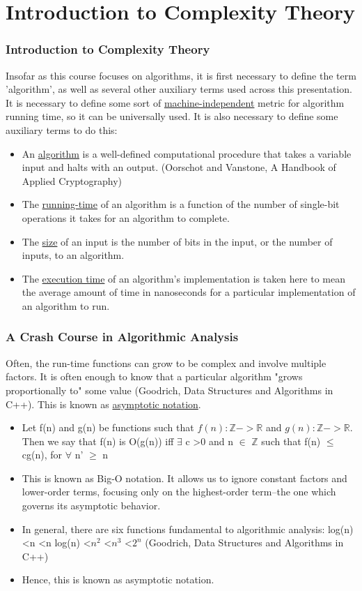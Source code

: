 \documentclass{beamer}
\begin{document}
\section{Introduction to Complexity Theory}
\begin{frame}
\frametitle{Introduction to Complexity Theory}
\small
\indent Insofar as this course focuses on algorithms, it is first necessary to define the term 'algorithm', as well as several other auxiliary terms used across this presentation.
It is necessary to define some sort of \underline{machine-independent} metric for algorithm running time, so it can be universally used. It is also necessary to define some auxiliary terms to do this:
\begin{itemize}
\item An \underline{algorithm} is a well-defined computational procedure that takes a variable input and halts with an output. (Oorschot and Vanstone, A Handbook of Applied Cryptography)
\item The \underline{running-time} of an algorithm is a function of the number of single-bit operations it takes for an algorithm to complete. 
\item The \underline{size} of an input is the number of bits in the input, or the number of inputs, to an algorithm.
\item The \underline{execution time} of an algorithm's implementation is taken here to mean the average amount of time in nanoseconds for a particular implementation of an algorithm to run. 
\end{itemize}
\end{frame}
\begin{frame}
\frametitle{A Crash Course in Algorithmic Analysis}
\small
\indent Often, the run-time functions can grow to be complex and involve multiple factors. It is often enough to know that a particular algorithm "grows proportionally to" some value (Goodrich, Data Structures and Algorithms in C++). This is known as \underline{asymptotic notation}. \\
\begin{itemize}
\item Let f(n) and g(n) be functions such that $f(n): \mathbb{Z}->\mathbb{R}$ and $g(n): \mathbb{Z}->\mathbb{R}$. Then we say that f(n) is O(g(n)) iff $\exists$ c \textgreater $0$ and n $\in$ $\mathbb{Z}$ such that 
f(n) $\leq$ cg(n), for $\forall$ n' $\geq$ n 
\item This is known as Big-O notation. It allows us to ignore constant factors and lower-order terms, focusing only on the highest-order term--the one which governs its asymptotic behavior.
\item In general, there are six functions fundamental to algorithmic analysis: log(n) \textless n \textless n log(n) \textless $n^2$ \textless $n^3$ \textless $2^n$ (Goodrich, Data Structures and Algorithms in C++)
\item Hence, this is known as asymptotic notation.
\end{itemize}
\end{frame}
\end{document}
